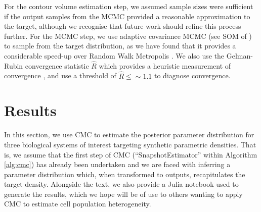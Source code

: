 \documentclass[10pt,letterpaper]{article}
\begin{document}
For the contour volume estimation step, we assumed sample sizes were sufficient if the output samples from the MCMC provided a reasonable approximation to the target, although we recognise that future work should refine this process further. For the MCMC step, we use adaptive covariance MCMC (see SOM of \cite{johnstone2016uncertainty}) to sample from the target distribution, as we have found that it provides a considerable speed-up over Random Walk Metropolis \cite{metropolis1953equation,lambert2018Student}. We also use the Gelman-Rubin convergence statistic $\hat{R}$ which provides a heuristic measurement of convergence \cite{lambert2018Student,gelman1992inference}, and use a threshold of $\hat{R}\leq\sim 1.1$ to diagnose convergence.


\section{Results}\label{sec:results}
In this section, we use CMC to estimate the posterior parameter distribution for three biological systems of interest targeting synthetic parametric densities. That is, we assume that the first step of CMC (``SnapshotEstimator'' within Algorithm \ref{alg:cmc}) has already been undertaken and we are faced with inferring a parameter distribution which, when transformed to outputs, recapitulates the target density. Alongside the text, we also provide a Julia notebook used to generate the results, which we hope will be of use to others wanting to apply CMC to estimate cell population heterogeneity.
\end{document}
